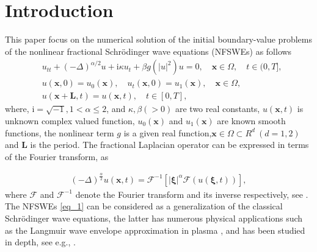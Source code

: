 \documentclass[preprint,compress,3p,10pt,fleqn]{elsarticle}
\numberwithin{equation}{section}
\begin{document}
	
	
\section{Introduction}\label{Section 1}
This paper focus on the numerical solution of the initial boundary-value problems of the nonlinear
fractional Schr{\"o}dinger wave equations (NFSWEs) as follows
\begin{align}
	&  u_{t t}+(-\Delta)^{\alpha / 2} u+\mathrm{i} \kappa u_{t}+\beta g(|u|^{2}) u=0, \quad \boldsymbol{x} \in \Omega, \quad  t \in(0, T],\label{eq_1}\\
& u(\boldsymbol{x}, 0)=u_{0}(\boldsymbol{x}), \quad u_{t}(\boldsymbol{x}, 0)=u_{1}(\boldsymbol{x}),\quad \boldsymbol{x} \in \Omega, \label{eq_2}\\
& u(\boldsymbol{x}+\boldsymbol{L}, t)=u(\boldsymbol{x}, t), \quad t \in[0, T],\label{eq_3}
\end{align}
where, $\mathrm{i}=\sqrt{-1}, 1<\alpha \leq 2$, and $\kappa, \beta(>0)$ are two real constants,
$ u(\boldsymbol{x}, t)$ is unknown complex valued function, $u_{0}(\boldsymbol{x})$ and
$u_{1}(\boldsymbol{x})$ are known smooth functions, the nonlinear term $g$ is a given real function,$\boldsymbol{x}\in\Omega\!\subset\!
R^d~(d\!=\!1,2)$ and $\boldsymbol{L}$ is the period. The fractional Laplacian operator can be expressed
in terms of the Fourier transform, as

\begin{align}\label{eq_4}
(-\Delta)^{\frac{\alpha}{2}} u(\boldsymbol{x},t)=\mathcal{F}^{-1}\left[|\boldsymbol{\xi}|^{\alpha} \mathcal{F}(u(\boldsymbol{\xi},t))\right],
\end{align}
where $\mathcal{F}$ and $\mathcal{F}^{-1}$ denote the Fourier transform and its inverse
respectively, see \cite{caffarelliExtensionProblemRelated2007}. The NFSWEs \eqref{eq_1}
can be considered as a generalization of the classical Schr{\"o}dinger wave
equations, the latter has numerous physical applications such as the Langmuir wave envelope
approximation in plasma \cite{colinSemidiscretizationTimeNonlinear1998}, and has been
studied in depth, see e.g., \cite{zhangConservativeNumericalScheme2003,baoUniformErrorEstimates2012,chengSeveralConservativeCompact2018,brugnanoClassEnergyconservingHamiltonian2018}.
\end{document}
